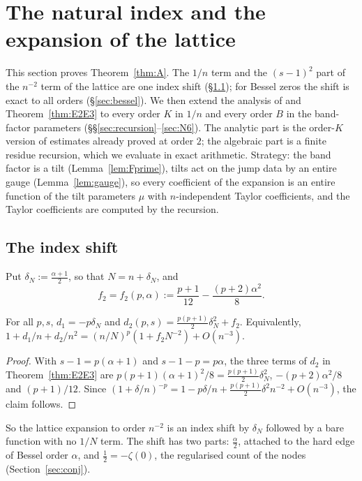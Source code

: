 \section{The natural index and the expansion of the lattice}\label{sec:natural}

This section proves Theorem~\ref{thm:A}. The $1/n$ term and the $(s-1)^2$ part of the $n^{-2}$ term of the lattice are
one index shift (\S\ref{sec:shift}); for Bessel zeros the shift is exact to all orders (\S\ref{sec:bessel}). We then
extend the analysis of \cite{PaperII} and Theorem~\ref{thm:E2E3} to every order $K$ in $1/n$ and every order $B$ in the
band-factor parameters (\S\S\ref{sec:recursion}--\ref{sec:N6}). The analytic part is the order-$K$ version of
estimates already proved at order $2$; the algebraic part is a finite residue recursion, which we evaluate in exact
arithmetic. Strategy: the band factor is a tilt (Lemma~\ref{lem:Fprime}), tilts act on the jump data by an entire gauge
(Lemma~\ref{lem:gauge}), so every coefficient of the expansion is an entire function of the tilt parameters $\mu$ with
$n$-independent Taylor coefficients, and the Taylor coefficients are computed by the recursion.

\subsection{The index shift}\label{sec:shift}
Put $\delta_N:=\frac{\alpha+1}2$, so that $N=n+\delta_N$, and
\begin{equation}\label{eq:f2}
  f_2=f_2(p,\alpha):=\frac{p+1}{12}-\frac{(p+2)\alpha^2}8 .
\end{equation}

\begin{proposition}\label{prop:N1}
For all $p,s$, $d_1=-p\delta_N$ and $d_2(p,s)=\frac{p(p+1)}2\delta_N^2+f_2$. Equivalently,
$1+d_1/n+d_2/n^2=(n/N)^p(1+f_2N^{-2})+O(n^{-3})$.
\end{proposition}

\begin{proof}
With $s-1=p(\alpha+1)$ and $s-1-p=p\alpha$, the three terms of $d_2$ in Theorem~\ref{thm:E2E3} are
$p(p+1)(\alpha+1)^2/8=\frac{p(p+1)}2\delta_N^2$, $-(p+2)\alpha^2/8$ and $(p+1)/12$. Since
$(1+\delta/n)^{-p}=1-p\delta/n+\frac{p(p+1)}2\delta^2n^{-2}+O(n^{-3})$, the claim follows.
\end{proof}

So the lattice expansion to order $n^{-2}$ is an index shift by $\delta_N$ followed by a bare function with no $1/N$
term. The shift has two parts: $\frac\alpha2$, attached to the hard edge of Bessel order $\alpha$, and
$\frac12=-\zeta(0)$, the regularised count of the nodes (Section~\ref{sec:conj}).

